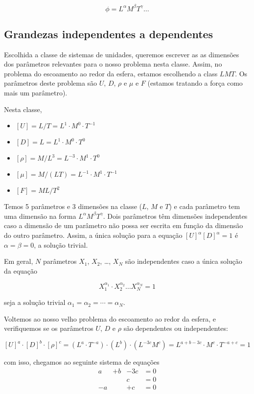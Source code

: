 \[
\phi = L^\alpha M^\beta T^\gamma \ldots
\]



\subsection{Grandezas independentes a dependentes}

Escolhida a classe de sistemas de unidades, queremos escrever as as dimensões dos parâmetros relevantes para o nosso problema nesta classe. Assim, no problema do escoamento ao redor da esfera, estamos escolhendo a class $LMT$. Os parâmetros deste problema são $U$, $D$, $\rho$ e $\mu$ e $F$  (estamos tratando a força como mais um parâmetro).

Nesta classe,

\begin{itemize}
\item $[U] = L/T = L^1\cdot M^0 \cdot T^{-1}$
\item $[D] = L = L^1 \cdot M^0\cdot T^0$
\item $[\rho] = M/L^3 = L^{-3}\cdot M^1\cdot T^0$
\item $[\mu] = M/(LT) = L^{-1}\cdot M^1\cdot T^{-1}$
\item $[F] = ML/T^2$
\end{itemize}

Temos 5 parâmetros e 3 dimensões na classe ($L$, $M$ e $T$) e cada parâmetro tem uma dimensão na forma $L^\alpha M^\beta T^\gamma$. Dois parâmetros têm dimensões independentes caso a dimensão de um parâmetro não possa ser escrita em função da dimensão do outro parâmetro. Assim, a única solução para a equação $[U]^\alpha [D]^\alpha = 1$ é $\alpha = \beta = 0$, a solução trivial.

Em geral, $N$ parâmetros $X_1$, $X_2$, \ldots, $X_N$ são independentes caso a única solução da equação

\[
X_1^{\alpha_1} \cdot X_2^{\alpha_2} \ldots X_N^{\alpha_N} = 1
\]

seja a solução trivial $\alpha_1 = \alpha_2 = \cdots = \alpha_N$.

Voltemos ao nosso velho problema do escoamento ao redor da esfera, e verifiquemos se os parâmetros $U$, $D$ e $\rho$ são dependentes ou independentes:

\[
  [U]^a \cdot [D]^b \cdot [\rho]^c = (L^a \cdot T^{-a}) \cdot (L^b) \cdot (L^{-3c}M^c) =
  L^{a+b-3c}\cdot M^c \cdot T^{-a + c} = 1
\]

com isso, chegamos ao seguinte sistema de equações
\[
\begin{aligned}
  a &+ b &- 3c &= 0 \\
  & & c & = 0 \\
  -a & &+c & = 0\\
\end{aligned}
\]


